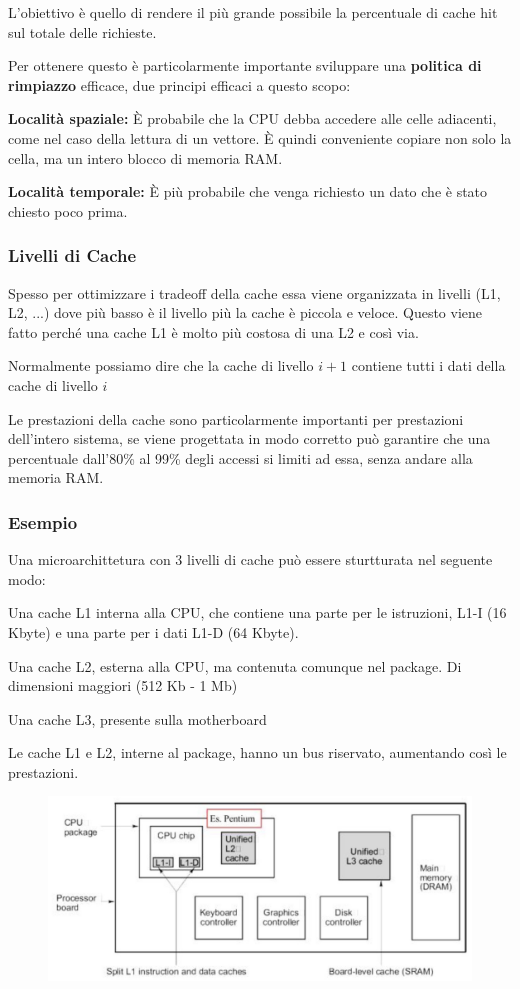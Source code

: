 \spacer
L'obiettivo è quello di rendere il più grande possibile la percentuale di cache hit sul totale delle richieste.

Per ottenere questo è particolarmente importante sviluppare una \textbf{politica di rimpiazzo} efficace, due principi efficaci a questo scopo:

\spacer
\begin{sitemize}
    \item \textbf{Località spaziale:} È probabile che la CPU debba accedere alle celle adiacenti, come nel caso della lettura di un vettore. È quindi conveniente copiare non solo la cella, ma un intero blocco di memoria RAM.
    \item \textbf{Località temporale:} È più probabile che venga richiesto un dato che è stato chiesto poco prima.
\end{sitemize}

\subsubsection*{Livelli di Cache}
Spesso per ottimizzare i tradeoff della cache essa viene organizzata in livelli (L1, L2, ...) dove più basso è il livello più la cache è piccola e veloce.
Questo viene fatto perché una cache L1 è molto più costosa di una L2 e così via.


Normalmente possiamo dire che la cache di livello $i + 1$ contiene tutti i dati della cache di livello $i$

\begin{note}
    Le prestazioni della cache sono particolarmente importanti per prestazioni dell'intero sistema, se viene progettata in modo corretto può garantire che una percentuale dall'80\% al 99\% degli accessi si limiti ad essa, senza andare alla memoria RAM.
\end{note}

\subsubsection{Esempio}
Una microarchittetura con 3 livelli di cache può essere sturtturata nel seguente modo:

\spacer
\begin{sitemize}
    \item Una cache L1 interna alla CPU, che contiene una parte per le istruzioni, L1-I (16 Kbyte) e una parte per i dati L1-D (64 Kbyte).
    \item Una cache L2, esterna alla CPU, ma contenuta comunque nel package. Di dimensioni maggiori (512 Kb - 1 Mb)
    \item Una cache L3, presente sulla motherboard
\end{sitemize}

\spacer
Le cache L1 e L2, interne al package, hanno un bus riservato, aumentando così le prestazioni.

\begin{figure}[H]
    \centering
    \includegraphics[width=0.5\linewidth]{assets/pentium-cache-architecture.jpeg}
\end{figure}

